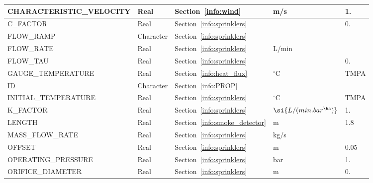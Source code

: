 \documentclass[11pt]{book}
\begin{document}
\begin{longtable}{@{\extracolsep{\fill}}|l|l|l|l|l|}
{\ct CHARACTERISTIC\_VELOCITY}          & Real          & Section~\ref{info:wind}                   & m/s                   & 1.       \\ \hline
{\ct C\_FACTOR}                         & Real          & Section~\ref{info:sprinklers}             &                       & 0.        \\ \hline
{\ct FLOW\_RAMP}                        & Character     & Section~\ref{info:sprinklers}             &                       &           \\ \hline
{\ct FLOW\_RATE}                        & Real          & Section~\ref{info:sprinklers}             & L/min                 &           \\ \hline
{\ct FLOW\_TAU}                         & Real          & Section~\ref{info:sprinklers}             &                       & 0.       \\ \hline
{\ct GAUGE\_TEMPERATURE}                & Real          & Section~\ref{info:heat_flux}              & $^\circ$C             & {\ct TMPA}\\ \hline
{\ct ID}                                & Character     & Section~\ref{info:PROP}                   &                       &           \\ \hline
{\ct INITIAL\_TEMPERATURE}              & Real          & Section~\ref{info:sprinklers}             & $^\circ$C             & {\ct TMPA}\\ \hline
{\ct K\_FACTOR}                         & Real          & Section~\ref{info:sprinklers}             & $\si{L/(min.bar^{\ha})}$ & 1.        \\ \hline
{\ct LENGTH}                            & Real          & Section~\ref{info:smoke_detector}         & m                     & 1.8       \\ \hline
{\ct MASS\_FLOW\_RATE}                  & Real          & Section~\ref{info:sprinklers}             & kg/s                  &           \\ \hline
{\ct OFFSET}                            & Real          & Section~\ref{info:sprinklers}             & m                     & 0.05      \\ \hline
{\ct OPERATING\_PRESSURE}               & Real          & Section~\ref{info:sprinklers}             & bar                   & 1.        \\ \hline
{\ct ORIFICE\_DIAMETER}                 & Real          & Section~\ref{info:sprinklers}             & m                     & 0.       \\ \hline

\end{longtable}
\end{document}
